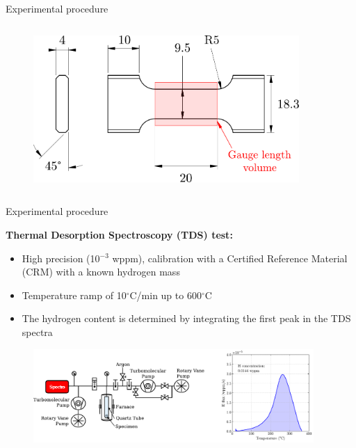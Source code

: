 \documentclass[9pt]{beamer}
\begin{document}
\begin{frame}{Experimental procedure}
\begin{columns}
\begin{column}{0.49\textwidth}
	\begin{figure}
		\centering
		\includegraphics[width=0.9\textwidth]{Images/TDS_specimen.pdf} \\
	\end{figure}
\end{column}

\end{columns}

\end{frame}


\begin{frame}{Experimental procedure}

\textbf{\textcolor{MINESBlue}{\large Thermal Desorption Spectroscopy (TDS) test:}}
\vspace{0.15cm}
\begin{itemize}
	\item High precision (10$^{-3}$ wppm), calibration with a Certified Reference Material (CRM) with a known hydrogen mass
	\vspace{0.15cm}
	\item Temperature ramp of 10$^{\circ}$C/min up to 600$^{\circ}$C 
	\vspace{0.15cm}
	\item The hydrogen content is determined by integrating the first peak in the TDS spectra
\end{itemize}

\begin{figure}
	\centering
	\includegraphics[width=0.95\textwidth]{Images/TDS_spectra.pdf} \\
\end{figure}

\end{frame}
\end{document}
